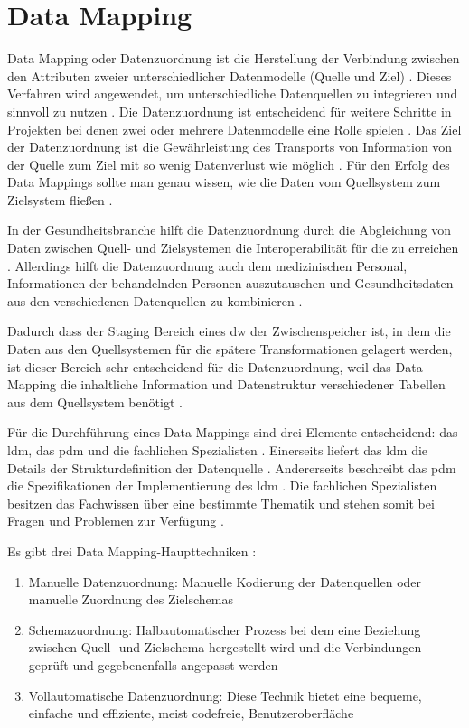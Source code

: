 \section{Data Mapping} \label{subsec:tbasub}

Data Mapping oder Datenzuordnung ist die Herstellung der Verbindung zwischen den Attributen zweier unterschiedlicher Datenmodelle (Quelle und Ziel) \cite{datamappingqs}. Dieses Verfahren wird angewendet, um unterschiedliche Datenquellen zu integrieren und sinnvoll zu nutzen \cite{datamappingastera}. Die Datenzuordnung ist entscheidend für weitere Schritte in Projekten bei denen zwei oder mehrere Datenmodelle eine Rolle spielen \cite{datamappingqs}. Das Ziel der Datenzuordnung ist die Gewährleistung des Transports von Information von der Quelle zum Ziel mit so wenig Datenverlust wie möglich \cite{datamappingastera}. Für den Erfolg des Data Mappings sollte man genau wissen, wie die Daten vom Quellsystem zum Zielsystem fließen \cite{datamappingqs}. 

In der Gesundheitsbranche hilft die Datenzuordnung durch die Abgleichung von Daten zwischen Quell- und Zielsystemen die Interoperabilität für die  zu erreichen \cite{interop, datamappingastera}. Allerdings hilft die Datenzuordnung auch dem medizinischen Personal, Informationen der behandelnden Personen auszutauschen und Gesundheitsdaten aus den verschiedenen Datenquellen zu kombinieren \cite{datamappingastera}.

Dadurch dass der Staging Bereich eines \ac{dw} der Zwischenspeicher ist, in dem die Daten aus den Quellsystemen für die spätere Transformationen gelagert werden, ist dieser Bereich sehr entscheidend für die Datenzuordnung, weil das Data Mapping die inhaltliche Information und Datenstruktur verschiedener Tabellen aus dem Quellsystem benötigt \cite{datamappingqs, datawarehouse}.

Für die Durchführung eines Data Mappings sind drei Elemente entscheidend: das \ac{ldm}, das \ac{pdm} und die fachlichen Spezialisten \cite{datamappingqs}. Einerseits liefert das \ac{ldm} die Details der Strukturdefinition der Datenquelle \cite{datamappingqs, datamodel}. Andererseits beschreibt das \ac{pdm} die Spezifikationen der Implementierung des \ac{ldm} \cite{datamodel}. Die fachlichen Spezialisten besitzen das Fachwissen über eine bestimmte Thematik und stehen somit bei Fragen und Problemen zur Verfügung \cite{smeitlexicon}.

Es gibt drei Data Mapping-Haupttechniken \cite{datamappingastera}:
\begin{enumerate}
  \item Manuelle Datenzuordnung: Manuelle Kodierung der Datenquellen oder manuelle Zuordnung des Zielschemas
  \item Schemazuordnung: Halbautomatischer Prozess bei dem eine Beziehung zwischen Quell- und Zielschema hergestellt wird und die Verbindungen geprüft und gegebenenfalls angepasst werden
  \item Vollautomatische Datenzuordnung: Diese Technik bietet eine bequeme, einfache und effiziente, meist codefreie, Benutzeroberfläche
\end{enumerate}

